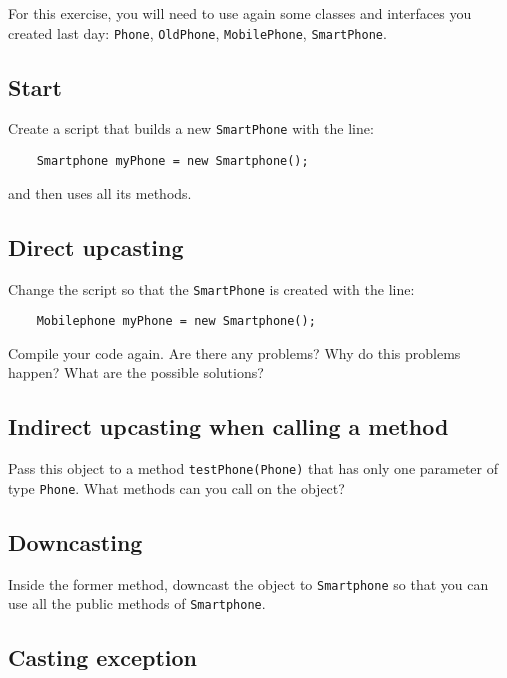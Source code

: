 \documentclass{article}
\begin{document}
For this exercise, you will need to use again some classes and
interfaces you created last day: \verb+Phone+, \verb+OldPhone+,
\verb+MobilePhone+, \verb+SmartPhone+. 


\subsection{Start}

Create a script that builds a new \verb+SmartPhone+ with the line: 

\begin{verbatim}
    Smartphone myPhone = new Smartphone();
\end{verbatim}

and then uses all its methods. 

\subsection{Direct upcasting}
\label{sec:b}

Change the script so that the \verb+SmartPhone+ is created with the
line: 

\begin{verbatim}
    Mobilephone myPhone = new Smartphone();
\end{verbatim}

Compile your code again. Are there any problems? Why do this problems
happen? What are the possible solutions?

\subsection{Indirect upcasting when calling a method}
\label{sec:c}

Pass this object to a method \verb+testPhone(Phone)+ 
that has only one parameter of type
\verb+Phone+. What methods can you call on the object?

\subsection{Downcasting}
\label{sec:downcasting}

Inside the former method, downcast the object to \verb+Smartphone+ so
that you can use all the public methods of \verb+Smartphone+. 

\subsection{Casting exception}
\label{sec:casting-exception}
\end{document}
